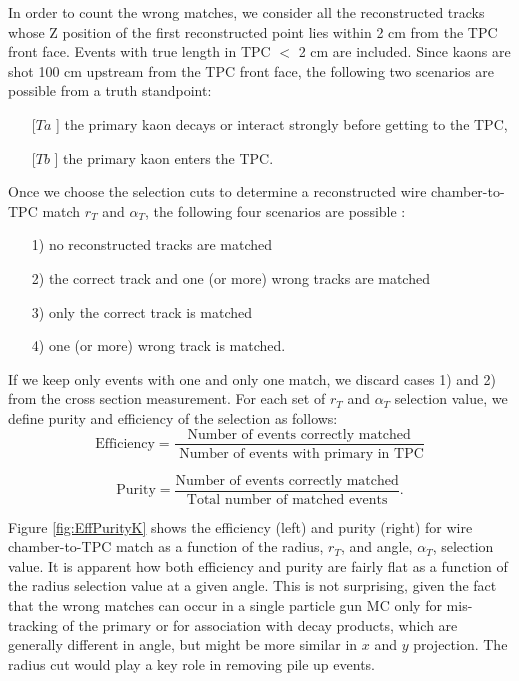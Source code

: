 In order to count the wrong matches, we consider all the reconstructed tracks whose Z position of the first reconstructed point lies within 2 cm from the TPC front face. Events with true length in TPC $<$ 2 cm are included. 
Since kaons are shot 100 cm upstream from the TPC front face, the following two scenarios are possible from a truth standpoint: 
\begin{itemize}
\item[[$Ta$]] the primary kaon decays or interact strongly before getting to the TPC,
\item[[$Tb$]] the primary kaon enters the TPC.
\end{itemize}

Once we choose the selection cuts to determine a reconstructed wire chamber-to-TPC match $r_{T}$ and $\alpha_{T}$, the following four scenarios are possible : 
\begin{itemize}
\item[1)] no reconstructed tracks are matched
\item[2)] the correct track and one (or more) wrong tracks are matched
\item[3)] only the correct track is matched
\item[4)] one (or more) wrong track is matched.
\end{itemize}

If we keep only events with one and only one match, we discard cases 1) and 2) from the cross section measurement. For each set of $r_{T}$ and $\alpha_{T}$ selection value, we define purity and efficiency of the selection as follows:
\begin{equation}
\text{Efficiency} = \frac{\text{Number of events correctly matched}}{\text{ Number of events with primary in TPC}}
\end{equation}

\begin{equation}
\text{Purity} = \frac{\text{Number of events correctly matched}}{\text{Total number of matched events}}.
\end{equation}

Figure \ref{fig:EffPurityK} shows the efficiency (left) and purity (right) for wire chamber-to-TPC match as a function of the radius, $r_{T}$, and angle, $\alpha_{T}$, selection value. It is apparent how both efficiency and purity are fairly flat as a function of the radius selection value at a given angle. This is not surprising, given the fact that the wrong matches can occur  in a single particle gun MC  only for mis-tracking of the primary or for association with decay products, which are generally different in angle, but might be more similar in $x$ and $y$ projection. The radius cut would play a key role in removing pile up events. 

